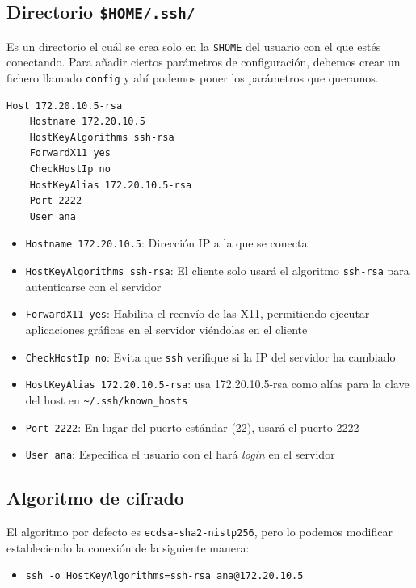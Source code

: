 \documentclass[11pt]{article}
\begin{document}
\subsection{Directorio \texttt{\$HOME/.ssh/}}
\label{sec:org0c4bbe4}
Es un directorio el cuál se crea solo en la \texttt{\$HOME} del usuario con el que estés conectando. Para añadir ciertos parámetros de configuración, debemos crear un fichero llamado \texttt{config} y ahí
podemos poner los parámetros que queramos.
\begin{verbatim}
Host 172.20.10.5-rsa
    Hostname 172.20.10.5
    HostKeyAlgorithms ssh-rsa
    ForwardX11 yes
    CheckHostIp no
    HostKeyAlias 172.20.10.5-rsa
    Port 2222
    User ana
\end{verbatim}
\begin{itemize}
\item \texttt{Hostname 172.20.10.5}: Dirección IP a la que se conecta
\item \texttt{HostKeyAlgorithms ssh-rsa}: El cliente solo usará el algoritmo \texttt{ssh-rsa} para autenticarse con el servidor
\item \texttt{ForwardX11 yes}: Habilita el reenvío de las X11, permitiendo ejecutar aplicaciones gráficas en el servidor viéndolas en el cliente
\item \texttt{CheckHostIp no}: Evita que \texttt{ssh} verifique si la IP del servidor ha cambiado
\item \texttt{HostKeyAlias 172.20.10.5-rsa}: usa 172.20.10.5-rsa como alías para la clave del host en \texttt{\textasciitilde{}/.ssh/known\_hosts}
\item \texttt{Port 2222}: En lugar del puerto estándar (22), usará el puerto 2222
\item \texttt{User ana}: Especifica el usuario con el hará \emph{login} en el servidor
\end{itemize}
\subsection{Algoritmo de cifrado}
\label{sec:orgfb9c5a1}
El algoritmo por defecto es \texttt{ecdsa-sha2-nistp256}, pero lo podemos modificar estableciendo la conexión de la siguiente manera:
\begin{itemize}
\item \texttt{ssh -o HostKeyAlgorithms=ssh-rsa ana@172.20.10.5}
\end{itemize}
\end{document}
